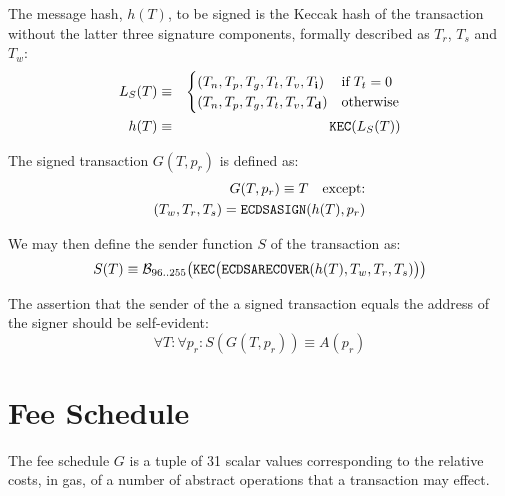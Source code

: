 \documentclass[9pt,oneside]{amsart}
\begin{document}
The message hash, $h(T)$, to be signed is the Keccak hash of the transaction without the latter three signature components, formally described as $T_r$, $T_s$ and $T_w$:
\begin{eqnarray}
L_S(T) & \equiv & \begin{cases}
(T_n, T_p, T_g, T_t, T_v, T_\mathbf{i}) & \text{if} \; T_t = 0\\
(T_n, T_p, T_g, T_t, T_v, T_\mathbf{d}) & \text{otherwise}
\end{cases} \\
h(T) & \equiv & \mathtt{\small KEC}( L_S(T) )
\end{eqnarray}

The signed transaction $G(T, p_r)$ is defined as:
\begin{eqnarray}
G(T, p_r) \equiv T \quad \text{except:} \\
(T_w, T_r, T_s) = \mathtt{\small ECDSASIGN}(h(T), p_r)
\end{eqnarray}

We may then define the sender function $S$ of the transaction as:
\begin{equation}
S(T) \equiv \mathcal{B}_{96..255}\big(\mathtt{\tiny KEC}\big( \mathtt{\small ECDSARECOVER}(h(T), T_w, T_r, T_s) \big) \big)
\end{equation}

The assertion that the sender of the a signed transaction equals the address of the signer should be self-evident:
\begin{equation}
\forall T: \forall p_r: S(G(T, p_r)) \equiv A(p_r)
\end{equation}

\section{Fee Schedule}\label{app:fees}

The fee schedule $G$ is a tuple of 31 scalar values corresponding to the relative costs, in gas, of a number of abstract operations that a transaction may effect.
\end{document}
